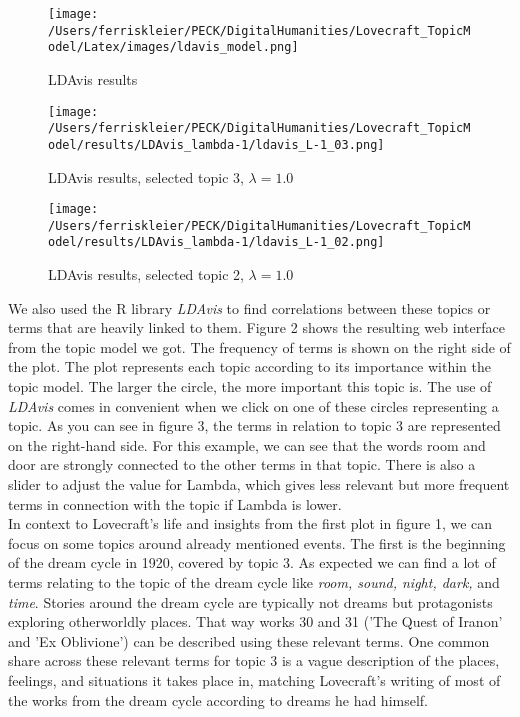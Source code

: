 \begin{figure}[ht]
    \centering
    \texttt{[image: /Users/ferriskleier/PECK/DigitalHumanities/Lovecraft\_TopicModel/Latex/images/ldavis\_model.png]}
    \caption{LDAvis results}
    \label{fig:mesh2}
\end{figure}

\begin{figure}[p]
    \centering
    \texttt{[image: /Users/ferriskleier/PECK/DigitalHumanities/Lovecraft\_TopicModel/results/LDAvis\_lambda-1/ldavis\_L-1\_03.png]}
    \caption{LDAvis results, selected topic 3, $\lambda=1.0$}
    \label{fig:mesh3}
\end{figure}

\begin{figure}[p]
    \centering
    \texttt{[image: /Users/ferriskleier/PECK/DigitalHumanities/Lovecraft\_TopicModel/results/LDAvis\_lambda-1/ldavis\_L-1\_02.png]}
    \caption{LDAvis results, selected topic 2, $\lambda=1.0$}
    \label{fig:mesh4}
\end{figure}

We also used the R library \textit{LDAvis} to find correlations between these topics or terms that are heavily 
linked to them. Figure 2 shows the resulting web interface from the topic model we got. The frequency 
of terms is shown on the right side of the plot. The plot represents each topic according to its 
importance within the topic model. The larger the circle, the more important this topic is. The use of 
\textit{LDAvis} comes in convenient when we click on one of these circles representing a topic. As you can see 
in figure 3, the terms in relation to topic 3 are represented on the right-hand side. For this example, 
we can see that the words room and door are strongly connected to the other terms in that topic. There 
is also a slider to adjust the value for Lambda, which gives less relevant but more frequent terms in 
connection with the topic if Lambda is lower.\\

In context to Lovecraft's life and insights from the first plot in figure 1, we can focus on some 
topics around already mentioned events. The first is the beginning of the dream cycle in 1920, covered 
by topic 3. As expected we can find a lot of terms relating to the topic of the dream cycle like \textit{room, 
sound, night, dark,} and \textit{time}. Stories around the dream cycle are typically not dreams but protagonists 
exploring otherworldly places. That way works 30 and 31 ('The Quest of Iranon' and 'Ex Oblivione') can 
be described using these relevant terms. One common share across these relevant terms for topic 3 is a 
vague description of the places, feelings, and situations it takes place in, matching Lovecraft's 
writing of most of the works from the dream cycle according to dreams he had himself.\\


